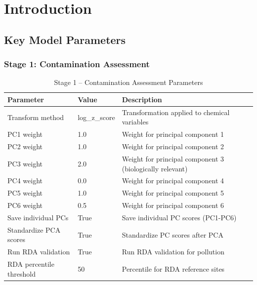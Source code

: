 \chapter{Introduction}

\section*{Key Model Parameters}


\subsection*{Stage 1: Contamination Assessment}

\begin{table}[H]
\centering
\caption{Stage 1 -- Contamination Assessment Parameters}
\label{tab:stage1_params}
\begin{tabular}{l|l|p{6cm}}
\hline
\textbf{Parameter} & \textbf{Value} & \textbf{Description} \\
\hline
Transform method & log\_z\_score & Transformation applied to chemical variables \\
PC1 weight & 1.0 & Weight for principal component 1 \\
PC2 weight & 1.0 & Weight for principal component 2 \\
PC3 weight & 2.0 & Weight for principal component 3 (biologically relevant) \\
PC4 weight & 0.0 & Weight for principal component 4 \\
PC5 weight & 1.0 & Weight for principal component 5 \\
PC6 weight & 0.5 & Weight for principal component 6 \\
Save individual PCs & True & Save individual PC scores (PC1-PC6) \\
Standardize PCA scores & True & Standardize PC scores after PCA \\
Run RDA validation & True & Run RDA validation for pollution \\
RDA percentile threshold & 50 & Percentile for RDA reference sites \\
\hline
\end{tabular}
\end{table}

